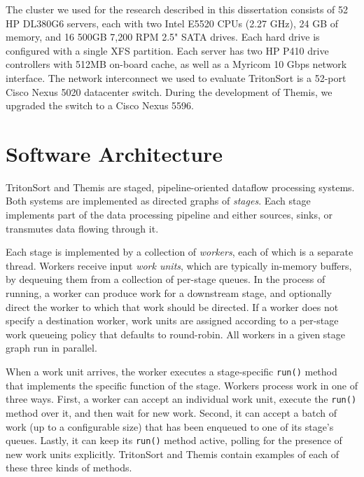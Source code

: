 The cluster we used for the research described in this dissertation consists of
52 HP DL380G6 servers, each with two Intel E5520 CPUs (2.27 GHz), 24 GB of
memory, and 16 500GB 7,200 RPM 2.5" SATA drives. Each hard drive is configured
with a single XFS partition. Each server has two HP P410 drive controllers with
512MB on-board cache, as well as a Myricom 10 Gbps network interface. The
network interconnect we used to evaluate TritonSort is a 52-port Cisco Nexus
5020 datacenter switch. During the development of Themis, we upgraded the
switch to a Cisco Nexus 5596.

\section{Software Architecture}

TritonSort and Themis are staged, pipeline-oriented dataflow processing
systems. Both systems are implemented as directed graphs of \emph{stages}. Each
stage implements part of the data processing pipeline and either sources,
sinks, or transmutes data flowing through it.

Each stage is implemented by a collection of \emph{workers}, each of which is a
separate thread. Workers receive input \emph{work units}, which are typically
in-memory buffers, by dequeuing them from a collection of per-stage queues. In
the process of running, a worker can produce work for a downstream stage, and
optionally direct the worker to which that work should be directed. If a worker
does not specify a destination worker, work units are assigned according to a
per-stage work queueing policy that defaults to round-robin. All workers in a
given stage graph run in parallel.

When a work unit arrives, the worker executes a stage-specific \texttt{run()}
method that implements the specific function of the stage. Workers process work
in one of three ways. First, a worker can accept an individual work unit,
execute the \texttt{run()} method over it, and then wait for new work. Second,
it can accept a batch of work (up to a configurable size) that has been
enqueued to one of its stage's queues. Lastly, it can keep its \texttt{run()}
method active, polling for the presence of new work units
explicitly. TritonSort and Themis contain examples of each of these three kinds
of methods.

